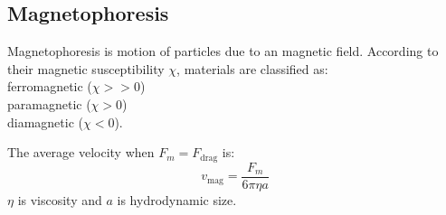 \subsection*{Magnetophoresis}
Magnetophoresis is motion of particles due to an magnetic field. According to their magnetic susceptibility $\chi$,
materials are classified as: \\
ferromagnetic ($\chi >> 0$) \\
paramagnetic ($\chi > 0$) \\
diamagnetic ($\chi < 0$).

The average velocity when $F_m = F_{\textrm{drag}}$ is:
\begin{equation*}
    v_{\textrm{mag}} = \frac{F_m}{6 \pi \eta a}
\end{equation*}
$\eta$ is  viscosity and $a$ is hydrodynamic size.